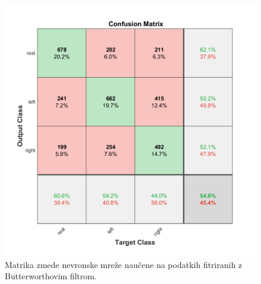     \begin{figure}[h!]
    \begin{center}
    \includegraphics[width=0.5\linewidth]{slike/Confusion_my.png}
    \end{center}
    \caption{Matrika zmede nevronske mreže naučene na podatkih fitriranih z Butterworthovim filtrom.}
    \end{figure}


